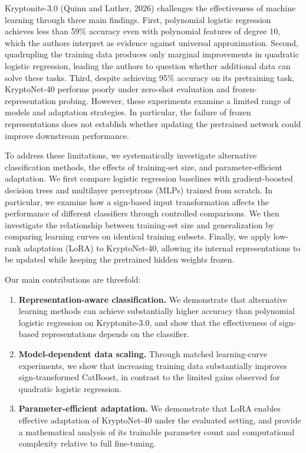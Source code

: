 \documentclass{article}
\begin{document}
Kryptonite-3.0 (Quinn and Luther, 2026) challenges the effectiveness of machine learning through three main findings. First, polynomial logistic regression achieves less than 59\% accuracy even with polynomial features of degree 10, which the authors interpret as evidence against universal approximation. Second, quadrupling the training data produces only marginal improvements in quadratic logistic regression, leading the authors to question whether additional data can solve these tasks. Third, despite achieving 95\% accuracy on its pretraining task, KryptoNet-40 performs poorly under zero-shot evaluation and frozen-representation probing. However, these experiments examine a limited range of models and adaptation strategies. In particular, the failure of frozen representations does not establish whether updating the pretrained network could improve downstream performance.

To address these limitations, we systematically investigate alternative classification methods, the effects of training-set size, and parameter-efficient adaptation. We first compare logistic regression baselines with gradient-boosted decision trees and multilayer perceptrons (MLPs) trained from scratch. In particular, we examine how a sign-based input transformation affects the performance of different classifiers through controlled comparisons. We then investigate the relationship between training-set size and generalization by comparing learning curves on identical training subsets. Finally, we apply low-rank adaptation (LoRA) to KryptoNet-40, allowing its internal representations to be updated while keeping the pretrained hidden weights frozen.

Our main contributions are threefold:

\begin{enumerate}
\item \textbf{Representation-aware classification.} We demonstrate that alternative learning methods can achieve substantially higher accuracy than polynomial logistic regression on Kryptonite-3.0, and show that the effectiveness of sign-based representations depends on the classifier.
\item \textbf{Model-dependent data scaling.} Through matched learning-curve experiments, we show that increasing training data substantially improves sign-transformed CatBoost, in contrast to the limited gains observed for quadratic logistic regression.
\item \textbf{Parameter-efficient adaptation.} We demonstrate that LoRA enables effective adaptation of KryptoNet-40 under the evaluated setting, and provide a mathematical analysis of its trainable parameter count and computational complexity relative to full fine-tuning.
\end{enumerate}
\end{document}
